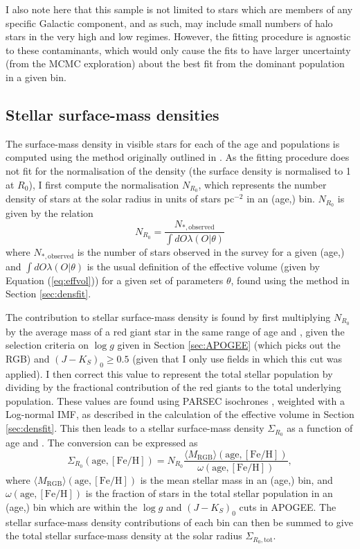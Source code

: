 I also note here that this sample is not limited to stars which are members of any specific Galactic component, and as such, may include small numbers of halo stars in the very high \afe{} and low \feh{} regimes. However, the fitting procedure is agnostic to these contaminants, which would only cause the fits to have larger uncertainty (from the MCMC exploration) about the best fit from the dominant population in a given bin.

\subsection{Stellar surface-mass densities}
 \label{sec:surfmasscalc}
The surface-mass density in visible stars for each of the age and \feh{} populations is computed using the method originally outlined in \citet{2012ApJ...751..131B}. As the fitting procedure does not fit for the normalisation of the density (the surface density is normalised to 1 at $R_0$), I first compute the normalisation $N_{R_0}$, which represents the number density of stars at the solar radius in units of stars pc$^{-2}$ in an (age,\feh{}) bin. $N_{R_0}$ is given by the relation 
\begin{equation}
 N_{R_0} = \frac{N_{*,\text{observed}}}{\int dO \lambda(O|\theta)}
\end{equation}
where $N_{*,\text{observed}}$ is the number of stars observed in the survey for a given (age,\feh{}) and $\int dO \lambda(O|\theta)$ is the usual definition of the effective volume (given by Equation (\ref{eq:effvol})) for a given set of parameters $\theta$, found using the method in Section \ref{sec:densfit}. 

The contribution to stellar surface-mass density is found by first multiplying $N_{R_0}$ by the average mass of a red giant star in the same range of age and \feh{}, given the selection criteria on $\log{g}$ given in Section \ref{sec:APOGEE} (which picks out the RGB) and  $(J-K_S)_0 \geq 0.5$ (given that I only use fields in which this cut was applied).  I then correct this value to represent the total stellar population by dividing by the fractional contribution of the red giants to the total underlying population. These values are found using PARSEC isochrones \citep{2012MNRAS.427..127B}, weighted with a Log-normal \citet{2001ApJ...554.1274C} IMF, as described in the calculation of the effective volume in Section \ref{sec:densfit}. This then leads to a stellar surface-mass density $\Sigma_{R_0}$ as a function of age and \feh{}. The conversion can be expressed as
\begin{equation}
 \Sigma_{R_0}(\mathrm{age,[Fe/H]}) = N_{R_0} \frac{\langle M_{\text{RGB}} \rangle (\mathrm{age,[Fe/H]})}{\omega(\mathrm{age,[Fe/H]})},
\end{equation}
where $\langle M_{\text{RGB}} \rangle (\mathrm{age,[Fe/H]})$ is the mean stellar mass in an (age,\feh{}) bin, and $\omega(\mathrm{age,[Fe/H]})$ is the fraction of stars in the total stellar population in an (age,\feh{}) bin which are within the $\log{g}$ and $(J-K_S)_0$ cuts in APOGEE. The stellar surface-mass density contributions of each bin can then be summed to give the total stellar surface-mass density at the solar radius $\Sigma_{R_0, \text{tot}}$.

